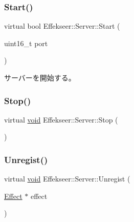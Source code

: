 \mbox{\label{class_effekseer_1_1_server_afd333e58d1330710673caf909452a4c1}} 
\subsubsection{\texorpdfstring{Start()}{Start()}}
{\footnotesize\ttfamily virtual bool Effekseer\+::\+Server\+::\+Start (\begin{DoxyParamCaption}\item[{uint16\+\_\+t}]{port }\end{DoxyParamCaption})\hspace{0.3cm}{\ttfamily [pure virtual]}}



サーバーを開始する。 

\mbox{\label{class_effekseer_1_1_server_ac41b09333e7d792489cbeef127df89f6}} 
\subsubsection{\texorpdfstring{Stop()}{Stop()}}
{\footnotesize\ttfamily virtual \mbox{\hyperlink{namespace_effekseer_ab34c4088e512200cf4c2716f168deb56}{void}} Effekseer\+::\+Server\+::\+Stop (\begin{DoxyParamCaption}{ }\end{DoxyParamCaption})\hspace{0.3cm}{\ttfamily [pure virtual]}}

\mbox{\label{class_effekseer_1_1_server_a81f7cfeac861a665a6d2905400735740}} 
\subsubsection{\texorpdfstring{Unregist()}{Unregist()}}
{\footnotesize\ttfamily virtual \mbox{\hyperlink{namespace_effekseer_ab34c4088e512200cf4c2716f168deb56}{void}} Effekseer\+::\+Server\+::\+Unregist (\begin{DoxyParamCaption}\item[{\mbox{\hyperlink{class_effekseer_1_1_effect}{Effect}} $\ast$}]{effect }\end{DoxyParamCaption})\hspace{0.3cm}{\ttfamily [pure virtual]}}



